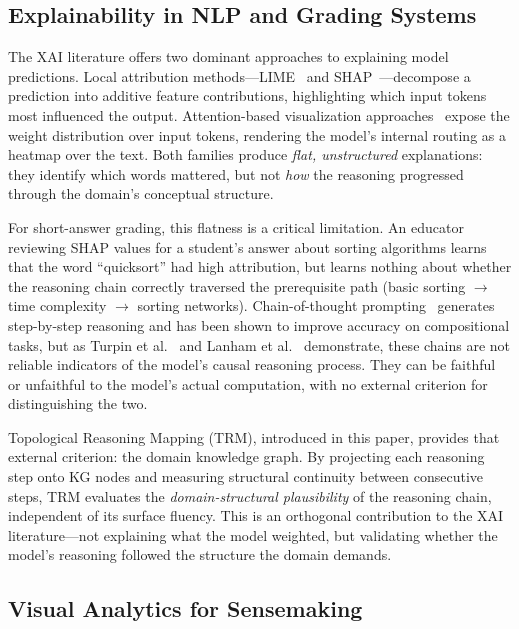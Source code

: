 \documentclass[journal,review]{vgtc}
\begin{document}
\subsection{Explainability in NLP and Grading Systems}

The XAI literature offers two dominant approaches to explaining model predictions. Local attribution methods---LIME~\cite{Ribeiro2016} and SHAP~\cite{Lundberg2017}---decompose a prediction into additive feature contributions, highlighting which input tokens most influenced the output. Attention-based visualization approaches~\cite{Jain2019} expose the weight distribution over input tokens, rendering the model's internal routing as a heatmap over the text. Both families produce \textit{flat, unstructured} explanations: they identify which words mattered, but not \textit{how} the reasoning progressed through the domain's conceptual structure.

For short-answer grading, this flatness is a critical limitation. An educator reviewing SHAP values for a student's answer about sorting algorithms learns that the word ``quicksort'' had high attribution, but learns nothing about whether the reasoning chain correctly traversed the prerequisite path (basic sorting $\rightarrow$ time complexity $\rightarrow$ sorting networks). Chain-of-thought prompting~\cite{Wei2022_CoT} generates step-by-step reasoning and has been shown to improve accuracy on compositional tasks, but as Turpin et al.~\cite{Turpin2023} and Lanham et al.~\cite{Lanham2023} demonstrate, these chains are not reliable indicators of the model's causal reasoning process. They can be faithful or unfaithful to the model's actual computation, with no external criterion for distinguishing the two.

Topological Reasoning Mapping (TRM), introduced in this paper, provides that external criterion: the domain knowledge graph. By projecting each reasoning step onto KG nodes and measuring structural continuity between consecutive steps, TRM evaluates the \textit{domain-structural plausibility} of the reasoning chain, independent of its surface fluency. This is an orthogonal contribution to the XAI literature---not explaining what the model weighted, but validating whether the model's reasoning followed the structure the domain demands.

\subsection{Visual Analytics for Sensemaking}
\end{document}
